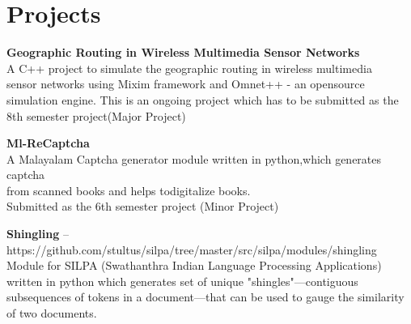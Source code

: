 \documentclass[11pt,a4paper]{moderncv}
\begin{document}




\section{Projects}

\cvlistitem
{\textbf{Geographic Routing in Wireless Multimedia Sensor Networks}  
  \\A C++ project to simulate the geographic routing in wireless multimedia \\
    sensor networks using Mixim framework and Omnet++ - an opensource simulation engine.
    This is an ongoing project which has to be submitted as the 8th semester project(Major Project) \\
}

\cvlistitem
{\textbf{Ml-ReCaptcha}  
  \\A Malayalam Captcha generator module written in python,which generates captcha\\
    from scanned books and helps todigitalize books.\\
    Submitted as the 6th semester project (Minor Project) \\
}

\cvlistitem
{\textbf{Shingling} -- {\small https://github.com/stultus/silpa/tree/master/src/silpa/modules/shingling}
  \\Module for SILPA (Swathanthra Indian Language Processing Applications)\\
    written in python which generates set of unique "shingles"—contiguous  \\
    subsequences of tokens in a document—that can be used to gauge the similarity of two documents.\\
}
\end{document}
